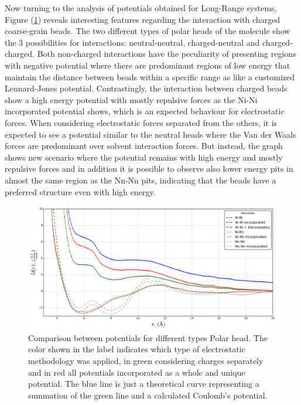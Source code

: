 \documentclass[10pt,a4paper,twoside]{article}
\begin{document}
Now turning to the analysis of potentials obtained for Long-Range systems, Figure (\ref{Fig:NNCha}) reveals interesting features regarding the interaction with charged coarse-grain beads. The two different types of polar heads of the molecule show the 3 possibilities for interactions: neutral-neutral, charged-neutral and charged-charged. Both non-charged interactions have the peculiarity of presenting regions with negative potential where there are predominant regions of low energy that maintain the distance between beads within a specific range as like a customized Lennard-Jones potential. Contrastingly, the interaction between charged beads show a high energy potential with mostly repulsive forces as the Ni-Ni incorporated potential shows, which is an expected behaviour for electrostatic forces. When considering electrostatic forces separated from the others, it is expected to see a  potential similar to the neutral heads where the Van der Waals forces are predominant over solvent interaction forces. But instead, the graph shows new scenario where the potential remains with high energy and mostly repulsive forces and in addition it is possible to observe also lower energy pits in almost the same region as the Nn-Nn pits, indicating that the beads have a preferred structure even with high energy.


\begin{figure}[H]
  \begin{center}
	\includegraphics[width=1 \textwidth]{./graphs/NNCha}
	\caption{Comparison between potentials for different types Polar head. The color shown in the label indicates which type of electrostatic methodology was applied, in green considering charges separately and in red all potentials incorporated as a whole and unique potential.  The blue line is just a theoretical curve representing a summation of the green line and a calculated Coulomb's potential.}
	\label{Fig:NNCha}
  \end{center}
\end{figure}
\end{document}
